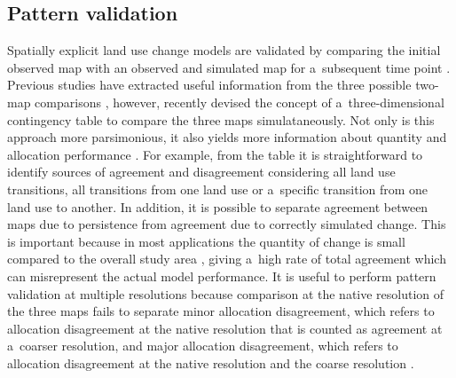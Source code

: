 \documentclass{icldt}\usepackage[]{graphicx}\usepackage[]{color}
\begin{document}
\subsection{Pattern validation}

Spatially explicit land use change models are validated by comparing the initial observed map with an observed and simulated map for a~subsequent time point \citep{pontius2011}. Previous studies have extracted useful information from the three possible two-map comparisons \citep[e.g.][]{pontius2008}, however, recently \citet{pontius2011} devised the concept of a~three-dimensional contingency table to compare the three maps simulataneously. Not only is this approach more parsimonious, it also yields more information about quantity and allocation performance \citep{pontius2011}. For example, from the table it is straightforward to identify sources of agreement and disagreement considering all land use transitions, all transitions from one land use or a~specific transition from one land use to another. In addition, it is possible to separate agreement between maps due to persistence from agreement due to correctly simulated change. This is important because in most applications the quantity of change is small compared to the overall study area \citep{pontius2004,vanvliet2011}, giving a~high rate of total agreement which can misrepresent the actual model performance. It is useful to perform pattern validation at multiple resolutions because comparison at the native resolution of the three maps fails to separate minor allocation disagreement, which refers to allocation disagreement at the native resolution that is counted as agreement at a~coarser resolution, and major allocation disagreement, which refers to allocation disagreement at the native resolution and the coarse resolution \citep{pontius2011}. \\
\end{document}
